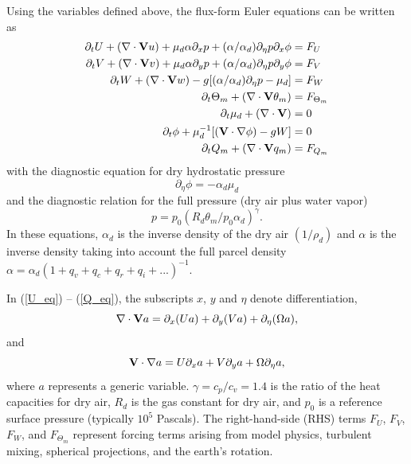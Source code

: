Using the variables defined above, the flux-form Euler equations can be
written as
%
\begin{align}
\partial_t U + (\nabla \cdot {\bf V}  u)
+ \mu_d \alpha \partial_x p 
+ (\alpha/\alpha_d) \partial_\eta p \partial_x \phi & = F_U \label{U_eq}\\
%
\partial_t V + (\nabla \cdot {\bf V} v ) 
+ \mu_d \alpha \partial_y p
+ (\alpha/\alpha_d) \partial_\eta p \partial_y \phi & = F_V \label{V_eq}\\
%
\partial_t W + (\nabla \cdot {\bf V} w )  
- g [ (\alpha/\alpha_d) \partial_\eta p - \mu_d ] & = F_W \label{W_eq}\\
%
\partial_t \Theta_m + (\nabla \cdot {\bf V} \theta_m )  & = F_{\Theta_m} \label{T_eq}\\
%
\partial_t \mu_d + (\nabla \cdot {\bf V} ) & = 0 \label{mu_eq}\\
%
\partial_t \phi + \mu_d^{-1} [({\bf V} \cdot \nabla \phi ) - gW ] & = 0 \label{phi_eq}\\
%
\partial_t Q_m + (\nabla \cdot {\bf V} q_m ) & = F_{Q_m} \label{Q_eq}
%
\end{align}
\noindent
with the diagnostic equation for dry hydrostatic pressure
%
\begin{equation}
\partial_\eta \phi  = - \alpha_d \mu_d \label{pd_eq}
\end{equation}
%
\noindent
and the diagnostic relation for the 
full pressure (dry air plus water vapor)
%
\begin{equation}
p = p_0 (R_d \theta_m / p_0 \alpha_d)^{\gamma}.
\label{ideal_gas_law}
\end{equation}
%
\noindent
In these equations, $\alpha_d$ is the inverse density of the dry air
$(1/\rho_d)$ and $\alpha$ is the inverse density taking into account the
full parcel density 
$\alpha = \alpha_d ( 1 + q_v + q_c + q_r + q_i + ...)^{-1}$. 

In (\ref{U_eq}) -- (\ref{Q_eq}), the subscripts 
$x$, $y$ and $\eta$ denote
differentiation, 
%
\begin{equation}
\nabla \cdot {\bf V } a = \partial_x (Ua) + 
                           \partial_y (Va) + 
                           \partial_\eta (\Omega a),
\notag
\end{equation}
%
\noindent
and
%
\begin{equation}
{\bf V} \cdot \nabla a = U \partial_x a + 
                           V \partial_y a + 
                           \Omega \partial_\eta a,
\notag
\end{equation}
%
\noindent
where $a$ represents a generic variable.  
$\gamma=c_p/c_v = 1.4$ is the ratio of
the heat capacities for dry air, $R_d$ is the gas constant for dry
air, and $p_0$ is a reference surface pressure (typically $10^5$ Pascals).
The right-hand-side (RHS) terms $F_U$, $F_V$, $F_W$, and
$F_{\Theta_m}$ represent forcing terms arising from model physics,
turbulent mixing, spherical projections, and the earth's rotation.

